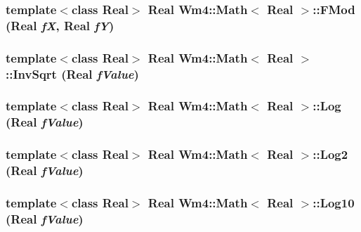 \subsubsection{\setlength{\rightskip}{0pt plus 5cm}template$<$class Real$>$ Real {\bf Wm4::Math}$<$ Real $>$::FMod (Real {\em f\-X}, Real {\em f\-Y})\hspace{0.3cm}{\tt  [static]}}\label{classWm4_1_1Math_e5a1db646c275f72a75cb62173c64d15}


\subsubsection{\setlength{\rightskip}{0pt plus 5cm}template$<$class Real$>$ Real {\bf Wm4::Math}$<$ Real $>$::Inv\-Sqrt (Real {\em f\-Value})\hspace{0.3cm}{\tt  [static]}}\label{classWm4_1_1Math_3f72786907e61979bf643d93c78a6897}


\subsubsection{\setlength{\rightskip}{0pt plus 5cm}template$<$class Real$>$ Real {\bf Wm4::Math}$<$ Real $>$::{\bf Log} (Real {\em f\-Value})\hspace{0.3cm}{\tt  [static]}}\label{classWm4_1_1Math_c57ffd80f97eba8d7f69bbf546488fce}


\subsubsection{\setlength{\rightskip}{0pt plus 5cm}template$<$class Real$>$ Real {\bf Wm4::Math}$<$ Real $>$::Log2 (Real {\em f\-Value})\hspace{0.3cm}{\tt  [static]}}\label{classWm4_1_1Math_3dca722bc6b3252f8911c5a5f5c6d9fd}


\subsubsection{\setlength{\rightskip}{0pt plus 5cm}template$<$class Real$>$ Real {\bf Wm4::Math}$<$ Real $>$::Log10 (Real {\em f\-Value})\hspace{0.3cm}{\tt  [static]}}\label{classWm4_1_1Math_cf4b54b6f3dccd9d8a14afd5e65cb003}


